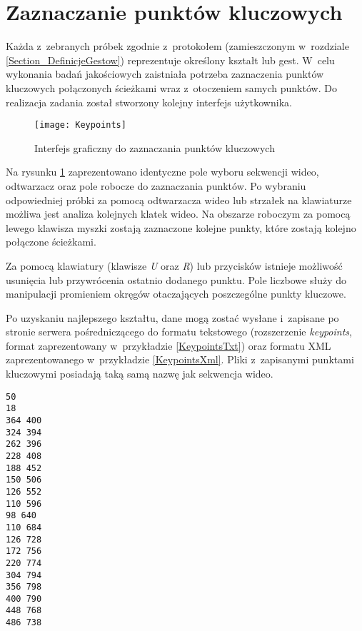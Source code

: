   \section{Zaznaczanie punktów kluczowych}\label{Section_Keypoints}
    Każda z~zebranych próbek zgodnie z~protokołem (zamieszczonym w~rozdziale \ref{Section_DefinicjeGestow}) reprezentuje określony kształt lub gest. W~celu wykonania badań jakościowych zaistniała potrzeba zaznaczenia punktów kluczowych połączonych ścieżkami wraz z~otoczeniem samych punktów. Do realizacja zadania został stworzony kolejny interfejs użytkownika.

    \begin{figure}[!ht]
      \centering
      \texttt{[image: Keypoints]}
      \caption[Interfejs graficzny do zaznaczania punktów kluczowych]{Interfejs graficzny do zaznaczania punktów kluczowych}
      \label{fig:Keypoints}
    \end{figure}

    Na rysunku \ref{fig:Keypoints} zaprezentowano identyczne pole wyboru sekwencji wideo, odtwarzacz oraz pole robocze do zaznaczania punktów. Po wybraniu odpowiedniej próbki za pomocą odtwarzacza wideo lub strzałek na klawiaturze możliwa jest analiza kolejnych klatek wideo. Na obszarze roboczym za pomocą lewego klawisza myszki zostają zaznaczone kolejne punkty, które zostają kolejno połączone ścieżkami.

    Za pomocą klawiatury (klawisze \textit{U} oraz \textit{R}) lub przycisków istnieje możliwość usunięcia lub przywrócenia ostatnio dodanego punktu. Pole liczbowe służy do manipulacji promieniem okręgów otaczających poszczególne punkty kluczowe.

    Po uzyskaniu najlepszego kształtu, dane mogą zostać wysłane i~zapisane po stronie serwera pośredniczącego do formatu tekstowego (rozszerzenie \textit{keypoints}, format zaprezentowany w~przykładzie \ref{KeypointsTxt}) oraz formatu XML zaprezentowanego w~przykładzie \ref{KeypointsXml}. Pliki z~zapisanymi punktami kluczowymi posiadają taką samą nazwę jak sekwencja wideo.

      \begin{sample}[ht]
        \begin{verbatim}
50
18
364 400
324 394
262 396
228 408
188 452
150 506
126 552
110 596
98 640
110 684
126 728
172 756
220 774
304 794
356 798
400 790
448 768
486 738
        \end{verbatim}
        \caption{Punkty kluczowe w~formacie tekstowym (sekwencja \textit{Person\_A\_C})}
        \label{KeypointsTxt}
      \end{sample}

